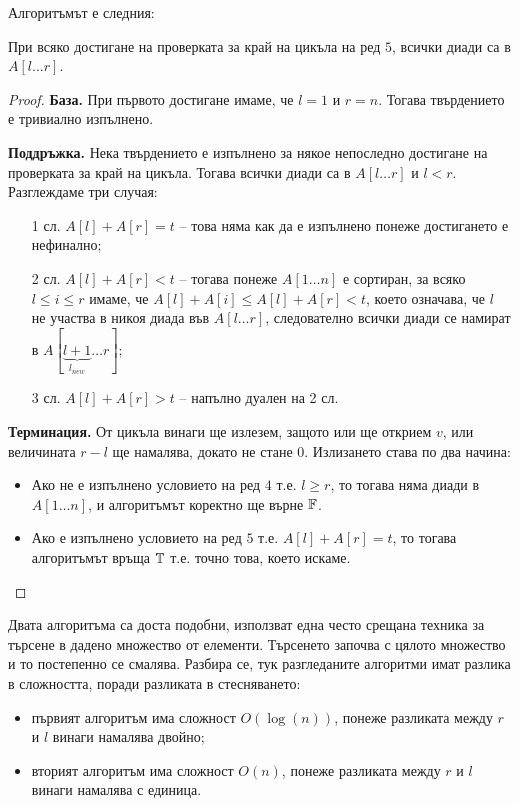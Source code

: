 \newpage

Алгоритъмът е следния:


\begin{invariant}
    При всяко достигане на проверката за край на цикъла на ред $5$, всички диади са в $A[l \dots r]$.
\end{invariant}

\begin{proof}
    \phantom{1}

    \textbf{База.}
    При първото достигане имаме, че $l = 1$ и $r = n$.
    Тогава твърдението е тривиално изпълнено.

    \textbf{Поддръжка.}
    Нека твърдението е изпълнено за някое непоследно достигане на проверката за край на цикъла.
    Тогава всички диади са в $A[l \dots r]$ и $l < r$.
    Разглеждаме три случая:
    \begin{itemize}
        \item[1 сл.] $A[l] + A[r] = t$ -- това няма как да е изпълнено понеже достигането е нефинално;
        \item[2 сл.] $A[l] + A[r] < t$ -- тогава понеже $A[1 \dots n]$ е сортиран, за всяко $l \leq i \leq r$ имаме, че $A[l] + A[i] \leq A[l] + A[r] < t$, което означава, че $l$ не участва в никоя диада във $A[l \dots r]$, следователно всички диади се намират в $A[\underbrace{l + 1}_{l_{new}} \dots r]$;
        \item[3 сл.] $A[l] + A[r] > t$ -- напълно дуален на 2 сл.
    \end{itemize}

    \textbf{Терминация.}
    От цикъла винаги ще излезем, защото или ще открием $v$, или величината $r - l$ ще намалява, докато не стане $0$.
    Излизането става по два начина:
    \begin{itemize}
        \item Ако не е изпълнено условието на ред $4$ т.е. $l \geq r$, то тогава няма диади в $A[1 \dots n]$, и алгоритъмът коректно ще върне $\mathbb{F}$.
        \item Ако е изпълнено условието на ред $5$ т.е. $A[l] + A[r] = t$, то тогава алгоритъмът връща $\mathbb{T}$ т.е. точно това, което искаме.
    \end{itemize}
\end{proof}

Двата алгоритъма са доста подобни, използват една често срещана техника за търсене в дадено множество от елементи.
Търсенето започва с цялото множество и то постепенно се смалява.
Разбира се, тук разгледаните алгоритми имат разлика в сложността, поради разликата в стесняването:
\begin{itemize}
    \item първият алгоритъм има сложност $O(\log(n))$, понеже разликата между $r$ и $l$ винаги намалява двойно;
    \item вторият алгоритъм има сложност $O(n)$, понеже разликата между $r$ и $l$ винаги намалява с единица.
\end{itemize}

